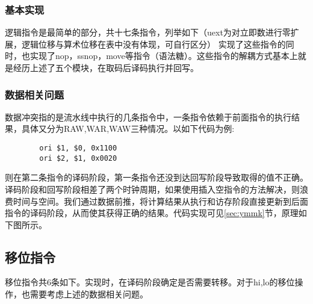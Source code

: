 \subsubsection{基本实现}
    逻辑指令是最简单的部分，共十七条指令，列举如下（uext为对立即数进行零扩展，逻辑位移与算术位移在表中没有体现，可自行区分）
    实现了这些指令的同时，也实现了nop，ssnop，move等指令（语法糖）。这些指令的解耦方式基本上就是经历上述了五个模块，在取码后译码执行并回写。
    \subsubsection{数据相关问题}
    数据冲突指的是流水线中执行的几条指令中，一条指令依赖于前面指令的执行结果，具体又分为RAW,WAR,WAW三种情况。以如下代码为例:
    \begin{verbatim}
        ori $1, $0, 0x1100
        ori $2, $1, 0x0020
    \end{verbatim}
    则在第二条指令的译码阶段，第一条指令还没到达回写阶段导致取得的值不正确。译码阶段和回写阶段相差了两个时钟周期，如果使用插入空指令的方法解决，则浪费时间与空间。我们通过数据前推，将计算结果从执行和访存阶段直接更新到后面指令的译码阶段，从而使其获得正确的结果。代码实现可见\ref{sec:ymmk}节，原理如下图所示。

\subsection{移位指令}
    移位指令共6条如下。实现时，在译码阶段确定是否需要转移。对于hi,lo的移位操作，也需要考虑上述的数据相关问题。
